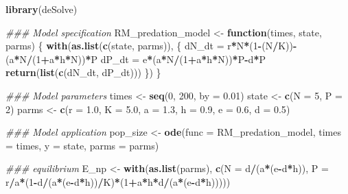 \documentclass[
]{book}
\newenvironment{Shaded}{\begin{snugshade}}{\end{snugshade}}
\newcommand{\CommentTok}[1]{\textcolor[rgb]{0.56,0.35,0.01}{\textit{#1}}}
\newcommand{\ControlFlowTok}[1]{\textcolor[rgb]{0.13,0.29,0.53}{\textbf{#1}}}
\newcommand{\DataTypeTok}[1]{\textcolor[rgb]{0.13,0.29,0.53}{#1}}
\newcommand{\DecValTok}[1]{\textcolor[rgb]{0.00,0.00,0.81}{#1}}
\newcommand{\FloatTok}[1]{\textcolor[rgb]{0.00,0.00,0.81}{#1}}
\newcommand{\KeywordTok}[1]{\textcolor[rgb]{0.13,0.29,0.53}{\textbf{#1}}}
\newcommand{\NormalTok}[1]{#1}
\newcommand{\OperatorTok}[1]{\textcolor[rgb]{0.81,0.36,0.00}{\textbf{#1}}}
\newcommand{\StringTok}[1]{\textcolor[rgb]{0.31,0.60,0.02}{#1}}
\begin{document}
\begin{Shaded}
\begin{Highlighting}[]
\KeywordTok{library}\NormalTok{(deSolve)}

\CommentTok{### Model specification}
\NormalTok{RM_predation_model <-}\StringTok{ }\ControlFlowTok{function}\NormalTok{(times, state, parms) \{}
  \KeywordTok{with}\NormalTok{(}\KeywordTok{as.list}\NormalTok{(}\KeywordTok{c}\NormalTok{(state, parms)), \{}
\NormalTok{    dN_dt =}\StringTok{ }\NormalTok{r}\OperatorTok{*}\NormalTok{N}\OperatorTok{*}\NormalTok{(}\DecValTok{1}\OperatorTok{-}\NormalTok{(N}\OperatorTok{/}\NormalTok{K))}\OperatorTok{-}\NormalTok{(a}\OperatorTok{*}\NormalTok{N}\OperatorTok{/}\NormalTok{(}\DecValTok{1}\OperatorTok{+}\NormalTok{a}\OperatorTok{*}\NormalTok{h}\OperatorTok{*}\NormalTok{N))}\OperatorTok{*}\NormalTok{P}
\NormalTok{    dP_dt =}\StringTok{ }\NormalTok{e}\OperatorTok{*}\NormalTok{(a}\OperatorTok{*}\NormalTok{N}\OperatorTok{/}\NormalTok{(}\DecValTok{1}\OperatorTok{+}\NormalTok{a}\OperatorTok{*}\NormalTok{h}\OperatorTok{*}\NormalTok{N))}\OperatorTok{*}\NormalTok{P}\OperatorTok{-}\NormalTok{d}\OperatorTok{*}\NormalTok{P}
    \KeywordTok{return}\NormalTok{(}\KeywordTok{list}\NormalTok{(}\KeywordTok{c}\NormalTok{(dN_dt, dP_dt)))  }
\NormalTok{  \})}
\NormalTok{\}}

\CommentTok{### Model parameters}
\NormalTok{times <-}\StringTok{ }\KeywordTok{seq}\NormalTok{(}\DecValTok{0}\NormalTok{, }\DecValTok{200}\NormalTok{, }\DataTypeTok{by =} \FloatTok{0.01}\NormalTok{)  }
\NormalTok{state <-}\StringTok{ }\KeywordTok{c}\NormalTok{(}\DataTypeTok{N =} \DecValTok{5}\NormalTok{, }\DataTypeTok{P =} \DecValTok{2}\NormalTok{)  }
\NormalTok{parms <-}\StringTok{ }\KeywordTok{c}\NormalTok{(}\DataTypeTok{r =} \FloatTok{1.0}\NormalTok{, }\DataTypeTok{K =} \FloatTok{5.0}\NormalTok{, }\DataTypeTok{a =} \FloatTok{1.3}\NormalTok{, }\DataTypeTok{h =} \FloatTok{0.9}\NormalTok{, }\DataTypeTok{e =} \FloatTok{0.6}\NormalTok{, }\DataTypeTok{d =} \FloatTok{0.5}\NormalTok{) }

\CommentTok{### Model application}
\NormalTok{pop_size <-}\StringTok{ }\KeywordTok{ode}\NormalTok{(}\DataTypeTok{func =}\NormalTok{ RM_predation_model, }\DataTypeTok{times =}\NormalTok{ times, }\DataTypeTok{y =}\NormalTok{ state, }\DataTypeTok{parms =}\NormalTok{ parms)}

\CommentTok{### equilibrium}
\NormalTok{E_np <-}\StringTok{ }\KeywordTok{with}\NormalTok{(}\KeywordTok{as.list}\NormalTok{(parms), }
             \KeywordTok{c}\NormalTok{(}\DataTypeTok{N =}\NormalTok{ d}\OperatorTok{/}\NormalTok{(a}\OperatorTok{*}\NormalTok{(e}\OperatorTok{-}\NormalTok{d}\OperatorTok{*}\NormalTok{h)),}
               \DataTypeTok{P =}\NormalTok{ r}\OperatorTok{/}\NormalTok{a}\OperatorTok{*}\NormalTok{(}\DecValTok{1}\OperatorTok{-}\NormalTok{d}\OperatorTok{/}\NormalTok{(a}\OperatorTok{*}\NormalTok{(e}\OperatorTok{-}\NormalTok{d}\OperatorTok{*}\NormalTok{h))}\OperatorTok{/}\NormalTok{K)}\OperatorTok{*}\NormalTok{(}\DecValTok{1}\OperatorTok{+}\NormalTok{a}\OperatorTok{*}\NormalTok{h}\OperatorTok{*}\NormalTok{d}\OperatorTok{/}\NormalTok{(a}\OperatorTok{*}\NormalTok{(e}\OperatorTok{-}\NormalTok{d}\OperatorTok{*}\NormalTok{h)))))}



\end{Highlighting}
\end{Shaded}
\end{document}
